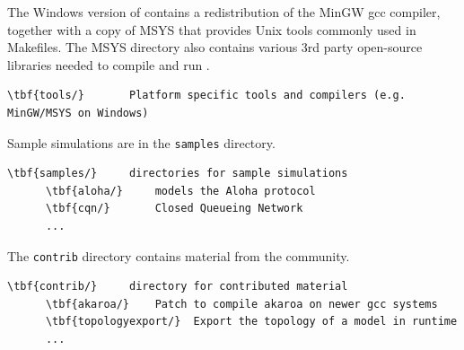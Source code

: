 The Windows version of {\opp} contains a redistribution of the MinGW
gcc compiler, together with a copy of MSYS that provides Unix tools
commonly used in Makefiles. The MSYS directory also contains various
3rd party open-source libraries needed to compile and run {\opp}.

\begin{Verbatim}[commandchars=\\\{\}]
    \tbf{tools/}       Platform specific tools and compilers (e.g. MinGW/MSYS on Windows)
\end{Verbatim}

Sample simulations are in the \texttt{samples} directory.

\begin{Verbatim}[commandchars=\\\{\}]
    \tbf{samples/}     directories for sample simulations
      \tbf{aloha/}     models the Aloha protocol
      \tbf{cqn/}       Closed Queueing Network
      ...
\end{Verbatim}

The \texttt{contrib} directory contains material from the {\opp} community.

\begin{Verbatim}[commandchars=\\\{\}]
    \tbf{contrib/}     directory for contributed material
      \tbf{akaroa/}    Patch to compile akaroa on newer gcc systems
      \tbf{topologyexport/}  Export the topology of a model in runtime
      ...
\end{Verbatim}



